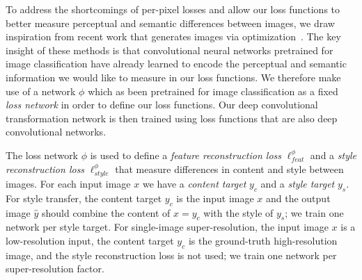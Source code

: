 \documentclass[runningheads]{llncs}
\begin{document}
To address the shortcomings of per-pixel losses and allow our loss functions to better
measure perceptual and semantic differences between images, we draw inspiration from recent
work that generates images via optimization~\cite{mahendran15understanding,simonyan2013deep,yosinski2015understanding,Gatys2015b,gatys2015neural}.
The key insight of these methods is that convolutional neural networks pretrained for image
classification have already learned to encode the perceptual and semantic information we
would like to measure in our loss functions. We therefore make use of a network $\phi$
which as been pretrained for image classification as a fixed \emph{loss network} in order
to define our loss functions. Our deep convolutional transformation network is then trained
using loss functions that are also deep convolutional networks.

The loss network $\phi$ is used to define a \emph{feature reconstruction loss}
$\ell_{feat}^\phi$ and a \emph{style reconstruction loss} $\ell_{style}^\phi$ that measure
differences in content and style between images. For each input image $x$ we have a
\emph{content target} $y_c$ and a \emph{style target} $y_s$. For style transfer, the content
target $y_c$ is the input image $x$ and the output image $\hat y$ should combine the content of
$x=y_c$ with the style of $y_s$; we train one network per style target. For single-image
super-resolution, the input image $x$ is a low-resolution input, the content target $y_c$ is
the ground-truth high-resolution image, and the style reconstruction loss is not used; we
train one network per super-resolution factor.

\end{document}
